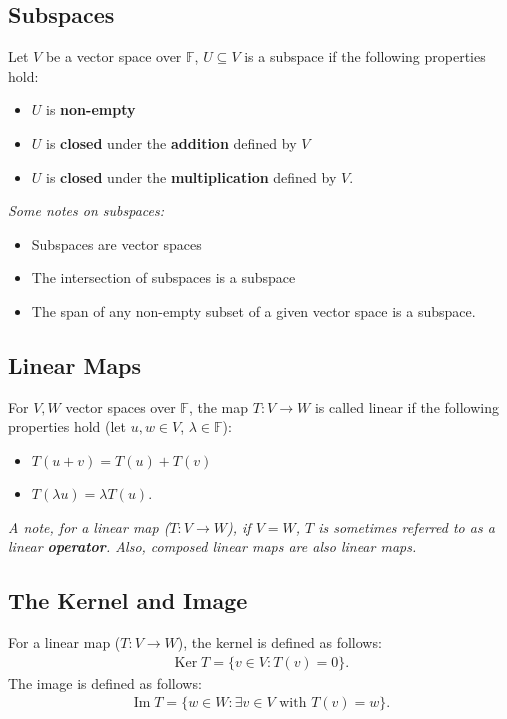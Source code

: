 \documentclass[a4paper, 12pt, twoside]{article}
\DeclareMathOperator{\Ker}{Ker}
\DeclareMathOperator{\Ima}{Im}
\begin{document}
\subsection{Subspaces}

Let $V$ be a vector space over $\mathbb{F}$, $U \subseteq V$ is a subspace if
the following properties hold:

\begin{itemize}
  \item $U$ is \textbf{non-empty}
  \item $U$ is \textbf{closed} under the \textbf{addition} defined by $V$
  \item $U$ is \textbf{closed} under the \textbf{multiplication} defined by $V$.
\end{itemize}

\textit{Some notes on subspaces:}

\begin{itemize}
  \item Subspaces are vector spaces
  \item The intersection of subspaces is a subspace
  \item The span of any non-empty subset of a given vector space is a subspace.
\end{itemize}

\subsection{Linear Maps}

For $V, W$ vector spaces over $\mathbb{F}$, the map $T: V \to W$ is called linear
if the following properties hold (let $u, w \in V$, $\lambda \in \mathbb{F}$):

\begin{itemize}
  \item $T(u + v) = T(u) + T(v)$
  \item $T(\lambda u) = \lambda T(u)$.
\end{itemize}

\textit{A note, for a linear map ($T: V \to W$), if $V = W$, $T$ is sometimes
  referred to as a linear \textbf{operator}. Also, composed linear maps are also linear maps.}

\subsection{The Kernel and Image}

For a linear map ($T: V \to W$), the kernel is defined as follows:
\begin{align*}
  \Ker{T} = \{v \in V : T(v) = 0\}.
\end{align*}
The image is defined as follows:
\begin{align*}
  \Ima{T} = \{w \in W : \exists v \in V \text{ with } T(v) = w\}.
\end{align*}
\end{document}
